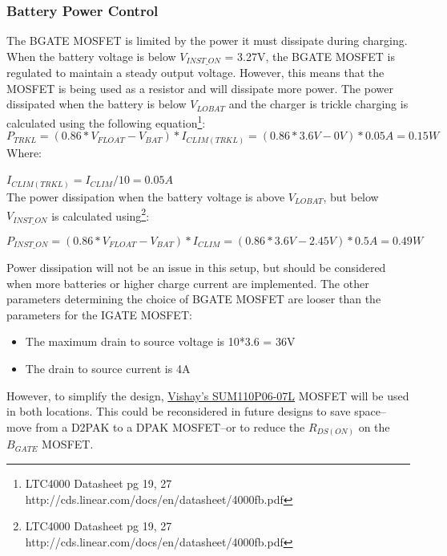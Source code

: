\documentclass{article}
\begin{document}
\subsubsection{Battery Power Control}
The BGATE MOSFET is limited by the power it must dissipate during charging. When the battery voltage is below $V_{INST\_ON}$ = 3.27V, the BGATE MOSFET is regulated to maintain a steady output voltage. However, this means that the MOSFET is being used as a resistor and will dissipate more power. The power dissipated when the battery is below $V_{LOBAT}$ and the charger is trickle charging is calculated using the following equation\footnote{LTC4000 Datasheet pg 19, 27 http://cds.linear.com/docs/en/datasheet/4000fb.pdf}:
\[P_{TRKL} = (0.86*V_{FLOAT} - V_{BAT})*I_{CLIM(TRKL)} = (0.86*3.6V - 0V)*0.05A = 0.15W\]
Where:

$I_{CLIM(TRKL)} = I_{CLIM}/10 = 0.05A$\\

The power dissipation when the battery voltage is above $V_{LOBAT}$, but below $V_{INST\_ON}$ is calculated using\footnote{LTC4000 Datasheet pg 19, 27 http://cds.linear.com/docs/en/datasheet/4000fb.pdf}:

\[P_{INST\_ON} = (0.86*V_{FLOAT} - V_{BAT})*I_{CLIM}= (0.86*3.6V - 2.45V)*0.5A = 0.49W\]

Power dissipation will not be an issue in this setup, but should be considered when more batteries or higher charge current are implemented. The other parameters determining the choice of BGATE MOSFET are looser than the parameters for the IGATE MOSFET:
\begin{itemize}
\item The maximum drain to source voltage is 10*3.6 = 36V
\item The drain to source current is 4A
\end{itemize}
However, to simplify the design, \href{http://www.vishay.com/docs/72439/72439.pdf}{Vishay's SUM110P06-07L} MOSFET will be used in both locations. This could be reconsidered in future designs to save space--move from a D2PAK to a DPAK MOSFET--or to reduce the $R_{DS(ON)}$ on the $B_{GATE}$ MOSFET.
\end{document}
